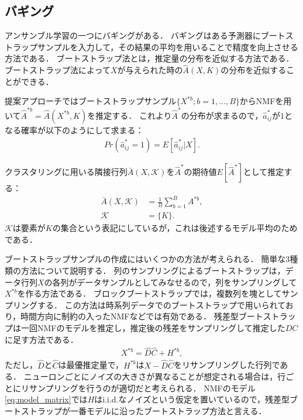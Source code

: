 \subsection{バギング}
アンサンブル学習の一つにバギング\cite{Breiman1996}がある．
バギングはある予測器にブートストラップサンプルを入力して，その結果の平均を用いることで精度を向上させる方法である．
ブートストラップ法\cite{Efron1979}とは，推定量の分布を近似する方法である．
ブートストラップ法によって$X$が与えられた時の$\hat{A}(X,K)$の分布を近似することができる．

提案アプローチではブートストラップサンプル$\{X^{*b}; b = 1, \dots, B\}$からNMFを用いて$\hat{A}^{*b} = \hat{A}(X^{*b},K)$を推定する．
これより$\hat{A}^*$の分布が求まるので，$\hat{a}^*_{ij}$が$1$となる確率が以下のようにして求まる：
\begin{align}
	Pr(\hat{a}^*_{ij} = 1) = E[\hat{a}^*_{ij}|X].
\end{align}

クラスタリングに用いる隣接行列$\bar{A}(X,\mathcal{K})$を$\hat{A}^*$の期待値$E[\hat{A}^*]$として推定する：
\begin{align}
	\bar{A}(X,\mathcal{K}) &= \frac{1}{B} \sum_{b=1}^B A^{*b}, \\
	\mathcal{K} &= \{K\}.
\end{align}
$\mathcal{K}$は要素が$K$の集合という表記にしているが，これは後述するモデル平均のためである．

ブートストラップサンプルの作成にはいくつかの方法が考えられる．
簡単な3種類の方法について説明する．
列のサンプリングによるブートストラップは，データ行列$X$の各列がデータサンプルとしてみなせるので，列をサンプリングして$X^{*b}$を作る方法である．
ブロックブートストラップでは，複数列を塊としてサンプリングする．
この方法は時系列データでのブートストラップで用いられており，時間方向に制約の入ったNMFなどでは有効である．
残差型ブートストラップは一回NMFのモデルを推定し，推定後の残差をサンプリングして推定した$DC$に足す方法である．
\begin{align}
	X^{*b} = \hat{D} \hat{C} + H^{*b},
\end{align}
ただし，$\hat{D}$と$\hat{C}$は最優推定量で，$H^{*b}$は$X - \hat{D}\hat{C}$をリサンプリングした行列である．
ニューロンごとにノイズの大きさが異なることが想定される場合は，行ごとにリサンプリングを行うのが適切だと考えられる．
NMFのモデル\eqref{eq:model_matrix}では$H$はi.i.d.なノイズという仮定を置いているので，残差型ブートストラップが一番モデルに沿ったブートストラップ方法と言える．


